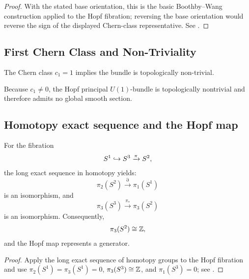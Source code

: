 \documentclass[11pt]{article}
\begin{document}
\begin{proof}
With the stated base orientation, this is the basic Boothby--Wang construction
applied to the Hopf fibration; reversing the base orientation would reverse the
sign of the displayed Chern-class representative.  See
\cite{BoothbyWang1958,geiges2008contact}.
\end{proof}


\subsection{First Chern Class and Non-Triviality}
\label{p1:der:chern-class}
The Chern class $c_1=1$ implies the bundle is topologically non-trivial.
\begin{remark}
Because \(c_1\neq 0\), the Hopf principal \(U(1)\)-bundle is topologically
nontrivial and therefore admits no global smooth section.
\end{remark}

\subsection{Homotopy exact sequence and the Hopf map}
\label{p1:der:hopf-homotopy}

\begin{theorem}
\label{p1:thm:hopf-homotopy-exact-sequence}
For the fibration
\[
S^1 \hookrightarrow S^3 \xrightarrow{\pi} S^2,
\]
the long exact sequence in homotopy yields:
\[
\pi_2(S^2)\xrightarrow{\partial}\pi_1(S^1)
\]
is an isomorphism, and
\[
\pi_3(S^3)\xrightarrow{\ \pi_*\ }\pi_3(S^2)
\]
is an isomorphism. Consequently,
\[
\pi_3(S^2)\cong \mathbb{Z},
\]
and the Hopf map represents a generator.
\end{theorem}

\begin{proof}
Apply the long exact sequence of homotopy groups to the Hopf fibration and use
\(\pi_2(S^1)=\pi_3(S^1)=0\), \(\pi_3(S^3)\cong\mathbb{Z}\), and \(\pi_1(S^3)=0\); see
\cite{steenrod1951topology,bott1982differential,hopf1931abbildung}.
\end{proof}
\end{document}
